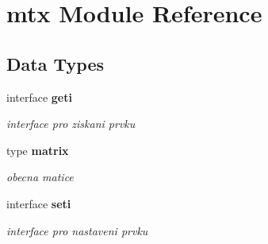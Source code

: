 \section{mtx Module Reference}
\label{namespacemtx}
\subsection*{Data Types}
\begin{DoxyCompactItemize}
\item 
interface {\bf geti}
\begin{DoxyCompactList}\small\item\em interface pro ziskani prvku \end{DoxyCompactList}\item 
type {\bf matrix}
\begin{DoxyCompactList}\small\item\em obecna matice \end{DoxyCompactList}\item 
interface {\bf seti}
\begin{DoxyCompactList}\small\item\em interface pro nastaveni prvku \end{DoxyCompactList}\end{DoxyCompactItemize}

